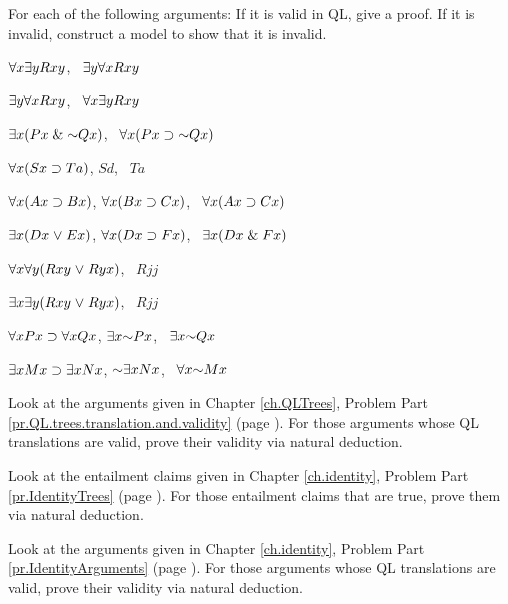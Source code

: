 \solutions
\problempart
\label{pr.QLvalidornot}
For each of the following arguments: If it is valid in QL, give a proof. If it is invalid, construct a model to show that it is invalid.
\begin{earg}
\item $\forall x\exists y Rxy$, \therefore\ $\exists y\forall x Rxy$
\item $\exists y\forall x Rxy$, \therefore\ $\forall x\exists y Rxy$
\item $\qt{\exists}{x}(Px \eand \enot Qx)$, \therefore\ $\qt{\forall}{x}(Px \eif \enot Qx)$
\item $\forall x(Sx \supset Ta)$, $Sd$, \therefore\ $Ta$
\item $\forall x(Ax\supset Bx)$, $\forall x(Bx \supset Cx)$, \therefore\ $\forall x(Ax \supset Cx)$
\item $\exists x(Dx \mkern1mu\vee\mkern1mu Ex)$, $\forall x(Dx \supset Fx)$, \therefore\ $\exists x(Dx \mathrel\& Fx)$
\item $\forall x\forall y(Rxy \mkern1mu\vee\mkern1mu Ryx)$, \therefore\ $Rjj$
\item $\exists x\exists y(Rxy \mkern1mu\vee\mkern1mu Ryx)$, \therefore\ $Rjj$
\item $\forall x Px \supset \forall x Qx$, $\qt{\exists}{x} \enot Px$, \therefore\ $\qt{\exists}{x} \enot Qx$
\item $\exists x Mx \supset \exists x Nx$, $\enot \qt{\exists}{x} Nx$, \therefore\ $\qt{\forall}{x} \enot Mx$
\end{earg}

\problempart
\label{pr.QLND.trees1}
Look at the arguments given in Chapter \ref{ch.QLTrees}, Problem Part \ref{pr.QL.trees.translation.and.validity} (page \pageref{pr.QL.trees.translation.and.validity}). For those arguments whose QL translations are valid, prove their validity via natural deduction.

\problempart
\label{pr.QLND.trees2}
Look at the entailment claims given in Chapter \ref{ch.identity}, Problem Part \ref{pr.IdentityTrees} (page \pageref{pr.IdentityTrees}). For those entailment claims that are true, prove them via natural deduction.

\problempart
\label{pr.QLND.trees3}
Look at the arguments given in Chapter \ref{ch.identity}, Problem Part \ref{pr.IdentityArguments} (page \pageref{pr.IdentityArguments}). For those arguments whose QL translations are valid, prove their validity via natural deduction.

\fi
